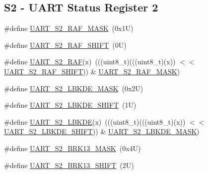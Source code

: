 \subsection*{S2 -\/ U\+A\+RT Status Register 2}
\begin{DoxyCompactItemize}
\item 
\#define \mbox{\hyperlink{group___u_a_r_t___register___masks_gaa16c5c48ff5ecf080e485880145828c0}{U\+A\+R\+T\+\_\+\+S2\+\_\+\+R\+A\+F\+\_\+\+M\+A\+SK}}~(0x1\+U)
\item 
\#define \mbox{\hyperlink{group___u_a_r_t___register___masks_ga0eb8d9ed83a7cb0ed2edc0d3906ac5f1}{U\+A\+R\+T\+\_\+\+S2\+\_\+\+R\+A\+F\+\_\+\+S\+H\+I\+FT}}~(0\+U)
\item 
\#define \mbox{\hyperlink{group___u_a_r_t___register___masks_ga6fb68989d33d0cd0c7908bd5bf3e498b}{U\+A\+R\+T\+\_\+\+S2\+\_\+\+R\+AF}}(x)~(((uint8\+\_\+t)(((uint8\+\_\+t)(x)) $<$$<$ \mbox{\hyperlink{group___u_a_r_t___register___masks_ga0eb8d9ed83a7cb0ed2edc0d3906ac5f1}{U\+A\+R\+T\+\_\+\+S2\+\_\+\+R\+A\+F\+\_\+\+S\+H\+I\+FT}})) \& \mbox{\hyperlink{group___u_a_r_t___register___masks_gaa16c5c48ff5ecf080e485880145828c0}{U\+A\+R\+T\+\_\+\+S2\+\_\+\+R\+A\+F\+\_\+\+M\+A\+SK}})
\item 
\#define \mbox{\hyperlink{group___u_a_r_t___register___masks_ga537e0b2cc3f4eb0056498ff63641bc3b}{U\+A\+R\+T\+\_\+\+S2\+\_\+\+L\+B\+K\+D\+E\+\_\+\+M\+A\+SK}}~(0x2\+U)
\item 
\#define \mbox{\hyperlink{group___u_a_r_t___register___masks_ga192cec151a02a4a29e46b3c061127434}{U\+A\+R\+T\+\_\+\+S2\+\_\+\+L\+B\+K\+D\+E\+\_\+\+S\+H\+I\+FT}}~(1\+U)
\item 
\#define \mbox{\hyperlink{group___u_a_r_t___register___masks_ga9530c0874c11c618df017716adb0131b}{U\+A\+R\+T\+\_\+\+S2\+\_\+\+L\+B\+K\+DE}}(x)~(((uint8\+\_\+t)(((uint8\+\_\+t)(x)) $<$$<$ \mbox{\hyperlink{group___u_a_r_t___register___masks_ga192cec151a02a4a29e46b3c061127434}{U\+A\+R\+T\+\_\+\+S2\+\_\+\+L\+B\+K\+D\+E\+\_\+\+S\+H\+I\+FT}})) \& \mbox{\hyperlink{group___u_a_r_t___register___masks_ga537e0b2cc3f4eb0056498ff63641bc3b}{U\+A\+R\+T\+\_\+\+S2\+\_\+\+L\+B\+K\+D\+E\+\_\+\+M\+A\+SK}})
\item 
\#define \mbox{\hyperlink{group___u_a_r_t___register___masks_gab2b333a78ce968eece87bcecd87a8673}{U\+A\+R\+T\+\_\+\+S2\+\_\+\+B\+R\+K13\+\_\+\+M\+A\+SK}}~(0x4\+U)
\item 
\#define \mbox{\hyperlink{group___u_a_r_t___register___masks_ga6b19eb1eefbef73859cc6eec77d863e4}{U\+A\+R\+T\+\_\+\+S2\+\_\+\+B\+R\+K13\+\_\+\+S\+H\+I\+FT}}~(2\+U)
\item 

\end{DoxyCompactItemize}

